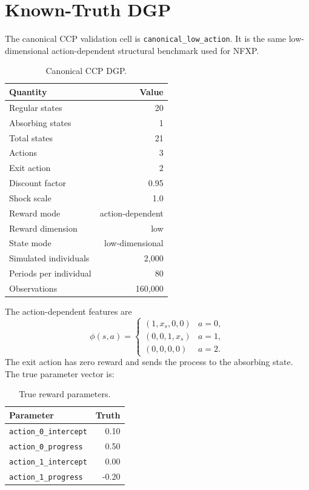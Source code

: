 \documentclass[10pt]{article}
\begin{document}
\section{Known-Truth DGP}

The canonical CCP validation cell is \texttt{canonical\_low\_action}. It is the
same low-dimensional action-dependent structural benchmark used for NFXP.

\begin{table}[H]
\centering\small
\caption{Canonical CCP DGP.}
\begin{tabular}{lr}
\toprule
Quantity & Value \\
\midrule
Regular states & 20 \\
Absorbing states & 1 \\
Total states & 21 \\
Actions & 3 \\
Exit action & 2 \\
Discount factor & 0.95 \\
Shock scale & 1.0 \\
Reward mode & action-dependent \\
Reward dimension & low \\
State mode & low-dimensional \\
Simulated individuals & 2,000 \\
Periods per individual & 80 \\
Observations & 160,000 \\
\bottomrule
\end{tabular}
\end{table}

The action-dependent features are
\[
\phi(s,a)
=
\begin{cases}
(1, x_s, 0, 0) & a = 0,\\
(0, 0, 1, x_s) & a = 1,\\
(0, 0, 0, 0) & a = 2.
\end{cases}
\]
The exit action has zero reward and sends the process to the absorbing state.
The true parameter vector is:

\begin{table}[H]
\centering\small
\caption{True reward parameters.}
\begin{tabular}{lr}
\toprule
Parameter & Truth \\
\midrule
\texttt{action\_0\_intercept} & 0.10 \\
\texttt{action\_0\_progress} & 0.50 \\
\texttt{action\_1\_intercept} & 0.00 \\
\texttt{action\_1\_progress} & -0.20 \\
\bottomrule
\end{tabular}
\end{table}
\end{document}
